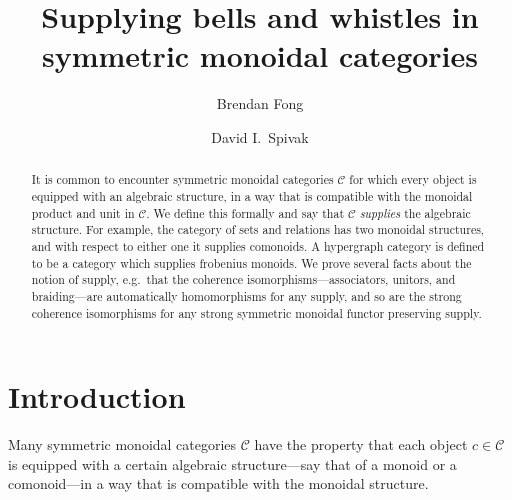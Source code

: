 \documentclass[11pt, oneside, article]{memoir}
\theoremstyle{plain}
\theoremstyle{definition}
\theoremstyle{remark}
\newcommand{\cat}[1]{\mathcal{#1}}%
\begin{document}
   

\title{Supplying bells and whistles in\\symmetric monoidal categories}
\author{Brendan Fong \and David I.\ Spivak}
\date{\vspace{-.3in}}
  
\maketitle

\begin{abstract}
It is common to encounter symmetric monoidal categories $\cat{C}$ for which every object is equipped with an algebraic structure, in a way that is compatible with the monoidal product and unit in $\cat{C}$. We define this formally and say that $\cat{C}$ \emph{supplies} the algebraic structure. For example, the category of sets and relations has two monoidal structures, and with respect to either one it supplies comonoids. A hypergraph category is defined to be a category which supplies frobenius monoids. We prove several facts about the notion of supply, e.g.\ that the coherence isomorphisms---associators, unitors, and braiding---are automatically homomorphisms for any supply, and so are the strong coherence isomorphisms for any strong symmetric monoidal functor preserving supply. 

\end{abstract}

\chapter{Introduction}

Many symmetric monoidal categories $\cat{C}$ have the property that each object $c\in\cat{C}$ is equipped with a certain algebraic structure---say that of a monoid or a comonoid---in a way that is compatible with the monoidal structure.
\end{document}
